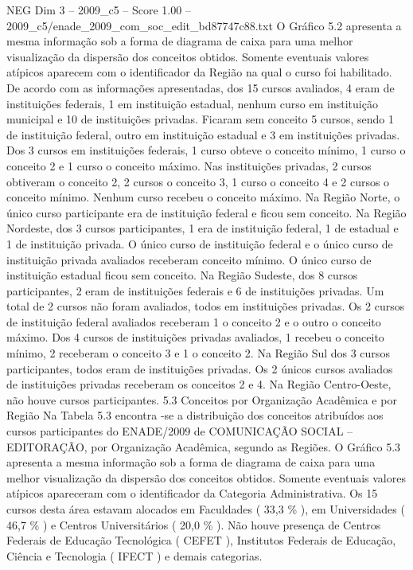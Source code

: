 \begin{textsample}{NEG Dim 3 – 2009\_c5 – Score 1.00 – 2009\_c5/enade\_2009\_com\_soc\_edit\_bd87747c88.txt}
O Gráfico 5.2 apresenta a mesma informação sob a forma de diagrama de caixa para uma melhor visualização da dispersão dos conceitos obtidos.
Somente eventuais valores atípicos aparecem com o identificador da Região na qual o curso foi habilitado.
De acordo com as informações apresentadas, dos 15 cursos avaliados, 4 eram de instituições federais, 1 em instituição estadual, nenhum curso em instituição municipal e 10 de instituições privadas.
Ficaram sem conceito 5 cursos, sendo 1 de instituição federal, outro em instituição estadual e 3 em instituições privadas.
Dos 3 cursos em instituições federais, 1 curso obteve o conceito mínimo, 1 curso o conceito 2 e 1 curso o conceito máximo.
Nas instituições privadas, 2 cursos obtiveram o conceito 2, 2 cursos o conceito 3, 1 curso o conceito 4 e 2 cursos o conceito mínimo.
Nenhum curso recebeu o conceito máximo.
Na Região Norte, o único curso participante era de instituição federal e ficou sem conceito.
Na Região Nordeste, dos 3 cursos participantes, 1 era de instituição federal, 1 de estadual e 1 de instituição privada.
O único curso de instituição federal e o único curso de instituição privada avaliados receberam conceito mínimo.
O único curso de instituição estadual ficou sem conceito.
Na Região Sudeste, dos 8 cursos participantes, 2 eram de instituições federais e 6 de instituições privadas.
Um total de 2 cursos não foram avaliados, todos em instituições privadas.
Os 2 cursos de instituição federal avaliados receberam 1 o conceito 2 e o outro o conceito máximo.
Dos 4 cursos de instituições privadas avaliados, 1 recebeu o conceito mínimo, 2 receberam o conceito 3 e 1 o conceito 2.
Na Região Sul dos 3 cursos participantes, todos eram de instituições privadas.
Os 2 únicos cursos avaliados de instituições privadas receberam os conceitos 2 e 4.
Na Região Centro-Oeste, não houve cursos participantes. 5.3 Conceitos por Organização Acadêmica e por Região Na Tabela 5.3 encontra -se a distribuição dos conceitos atribuídos aos cursos participantes do ENADE/2009 de COMUNICAÇÃO SOCIAL – EDITORAÇÃO, por Organização Acadêmica, segundo as Regiões.
O Gráfico 5.3 apresenta a mesma informação sob a forma de diagrama de caixa para uma melhor visualização da dispersão dos conceitos obtidos.
Somente eventuais valores atípicos apareceram com o identificador da Categoria Administrativa.
Os 15 cursos desta área estavam alocados em Faculdades ( 33,3 \% ), em Universidades ( 46,7 \% ) e Centros Universitários ( 20,0 \% ).
Não houve presença de Centros Federais de Educação Tecnológica ( CEFET ), Institutos Federais de Educação, Ciência e Tecnologia ( IFECT ) e demais categorias.

\end{textsample}
